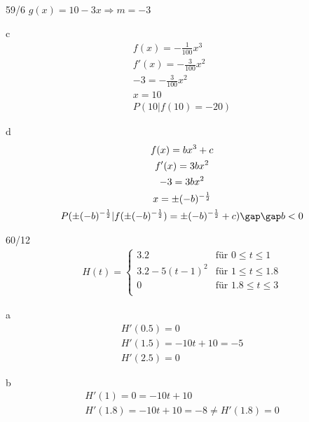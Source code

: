 \begin{exercise}{59/6}
  $g(x) = 10 - 3x \Rightarrow m = -3$
  \item [c]
  \begin{gather*}
    f(x) = -\frac{1}{100}x^3 \\
    f'(x) = -\frac{3}{100}x^2 \\
    -3 = -\frac{3}{100}x^2 \\
    x = 10 \\
    P(10 | f(10) = -20)
  \end{gather*}
  \item [d]
  \begin{gather*}
    f(x) = bx^3 + c \\
    f'(x) = 3bx^2 \\
    -3 = 3bx^2 \\
    x = \pm (-b)^{-\frac{1}{2}} \\
    P(\pm (-b)^{-\frac{1}{2}} | f(\pm (-b)^{-\frac{1}{2}}) = \pm (-b)^{-\frac{1}{2}}+ c) \gap\gap b < 0
  \end{gather*}
\end{exercise}
\begin{exercise}{60/12}
  \begin{gather*}
    H(t) =
    \begin{cases}
      3.2 & \text{für } 0 \leq t \leq 1 \\
      3.2 - 5(t - 1)^2 & \text{für } 1 \leq t \leq 1.8 \\
      0 & \text{für } 1.8 \leq t \leq 3 \\
    \end{cases}
  \end{gather*}
  \item [a]
  \begin{gather*}
    H'(0.5) = 0 \\
    H'(1.5) = -10t + 10 = -5 \\
    H'(2.5) = 0
  \end{gather*}
  \item [b]
  \begin{gather*}
    H'(1) = 0 = -10t + 10 \\
    H'(1.8) = -10t + 10 = -8 \neq H'(1.8) = 0
  \end{gather*}
\end{exercise}
